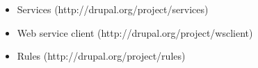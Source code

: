 \begin{itemize}
  \item Services (http://drupal.org/project/services)
  \item Web service client (http://drupal.org/project/wsclient)
  \item Rules (http://drupal.org/project/rules)	
\end{itemize}